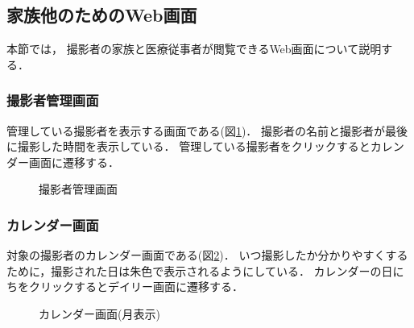 \documentclass[../report]{subfiles}
\begin{document}
\subsection{家族他のためのWeb画面}
本節では， 撮影者の家族と医療従事者が閲覧できるWeb画面について説明する．

\subsubsection{撮影者管理画面}
管理している撮影者を表示する画面である(図\ref{fig:5_dashboard})．
撮影者の名前と撮影者が最後に撮影した時間を表示している．
管理している撮影者をクリックするとカレンダー画面に遷移する．

\begin{figure}[htbp]
    \begin{center}
        \caption{撮影者管理画面}
        \label{fig:5_dashboard}
    \end{center}
\end{figure}

\subsubsection{カレンダー画面}
対象の撮影者のカレンダー画面である(図\ref{fig:5_calendar-month})．
いつ撮影したか分かりやすくするために，撮影された日は朱色で表示されるようにしている．
カレンダーの日にちをクリックするとデイリー画面に遷移する．

\begin{figure}[htbp]
    \begin{center}
        \caption{カレンダー画面(月表示)}
        \label{fig:5_calendar-month}
    \end{center}
\end{figure}
\end{document}
